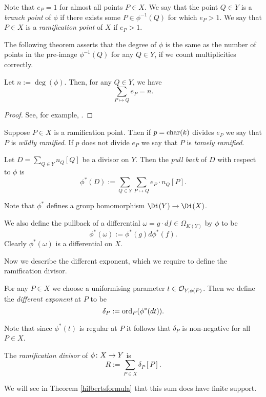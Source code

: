 \begin{cor}
Note that $e_P =1$ for almost all points $P \in X$.
We say that the point $Q \in Y$ is a \emph{branch point} of $\phi$ if there exists some $P \in \phi^{-1}(Q)$ for which $e_P >1$.
We say that $P \in X$ is a \emph{ramification point} of $X$ if $e_P >1$.

The following theorem asserts that the degree of $\phi$ is the same as the number of points in the pre-image $\phi^{-1}(Q)$ for any $Q \in Y$, if we count multiplicities correctly.

    \begin{thm}
    Let $n := \deg(\phi)$.
    Then, for any $Q \in Y$, we have 
        \[
        \sum_{P \mapsto Q} e_P = n.
        \]
    \end{thm}
    \begin{proof}
    See, for example, \cite[Pg.\ 290]{liu}.
    \end{proof}

    
Suppose $P \in X$ is a ramification point.
Then if $p = \operatorname{char}(k)$ divides $e_P$ we say that $P$ is \emph{wildly ramified}.
If $p$ does not divide $e_P$ we say that $P$ is \emph{tamely ramified}.

    \begin{defn}
    Let $D = \sum_{Q \in Y}n_Q [Q]$ be a divisor on $Y$.
    Then the \emph{pull back} of $D$ with respect to $\phi$ is
        \[
        \phi^*(D) := \sum_{Q \in Y} \sum_{P \mapsto Q} e_P \cdot n_Q [P].
        \]
    \end{defn}

Note that $\phi^*$ defines a group homomorphism $\Di(Y) \ra \Di(X)$.


We also define the pullback of a differential $\omega = g\cdot df \in \Omega_{K(Y)}$ by $\phi$ to be
    \[
    \phi^*(\omega) := \phi^*(g)d\phi^*(f).
    \]
Clearly $\phi^*(\omega)$ is a differential on $X$.


Now we describe the different exponent, which we require to define the ramification divisor.
    \begin{defn}\label{definitiondifferent}
    For any $P\in X$ we choose a uniformising parameter $t \in {\cal O}_{Y,\phi(P)}$.
    Then we define the \emph{different exponent} at $P$ to be 
        \[
        \delta_P : = \operatorname{ord}_P(\phi^*(dt)).
        \]
    \end{defn}

Note that since $\phi^*(t)$ is regular at $P$ it follows that $\delta_P$ is non-negative for all $P \in X$.
 
    \begin{defn}\label{defnramificationdivisor}
    The \emph{ramification divisor} of $\phi \colon X \rightarrow Y$ is 
        \[
        R:= \sum_{P \in X} \delta_P [P].
        \]
    \end{defn}
We will see in Theorem \ref{hilbertsformula} that this sum does have finite support.


\end{cor}
